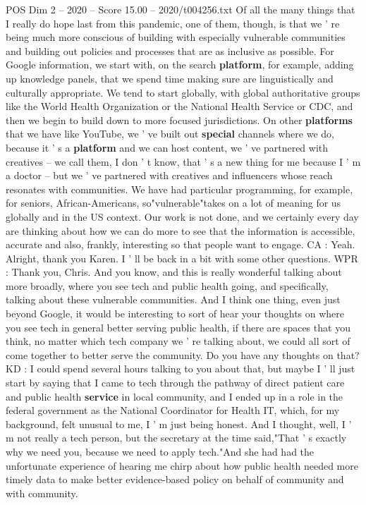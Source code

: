 \begin{textsample}{POS Dim 2 – 2020 – Score 15.00 – 2020/t004256.txt}
Of all the many things that I really do hope last from this pandemic, one of them, though, is that we ' re being much more conscious of building with especially vulnerable communities and building out policies and processes that are as inclusive as possible.
For Google information, we start with, on the search \textbf{platform}, for example, adding up knowledge panels, that we spend time making sure are linguistically and culturally appropriate.
We tend to start globally, with global authoritative groups like the World Health Organization or the National Health Service or CDC, and then we begin to build down to more focused jurisdictions.
On other \textbf{platforms} that we have like YouTube, we ' ve built out \textbf{special} channels where we do, because it ' s a \textbf{platform} and we can host content, we ' ve partnered with creatives -- we call them, I don ' t know, that ' s a new thing for me because I ' m a doctor -- but we ' ve partnered with creatives and influencers whose reach resonates with communities.
We have had particular programming, for example, for seniors, African-Americans, so"vulnerable"takes on a lot of meaning for us globally and in the US context.
Our work is not done, and we certainly every day are thinking about how we can do more to see that the information is accessible, accurate and also, frankly, interesting so that people want to engage.
CA : Yeah.
Alright, thank you Karen.
I ' ll be back in a bit with some other questions.
WPR : Thank you, Chris.
And you know, and this is really wonderful talking about more broadly, where you see tech and public health going, and specifically, talking about these vulnerable communities.
And I think one thing, even just beyond Google, it would be interesting to sort of hear your thoughts on where you see tech in general better serving public health, if there are spaces that you think, no matter which tech company we ' re talking about, we could all sort of come together to better serve the community.
Do you have any thoughts on that?
KD : I could spend several hours talking to you about that, but maybe I ' ll just start by saying that I came to tech through the pathway of direct patient care and public health \textbf{service} in local community, and I ended up in a role in the federal government as the National Coordinator for Health IT, which, for my background, felt unusual to me, I ' m just being honest.
And I thought, well, I ' m not really a tech person, but the secretary at the time said,"That ' s exactly why we need you, because we need to apply tech."And she had had the unfortunate experience of hearing me chirp about how public health needed more timely data to make better evidence-based policy on behalf of community and with community.

\end{textsample}
